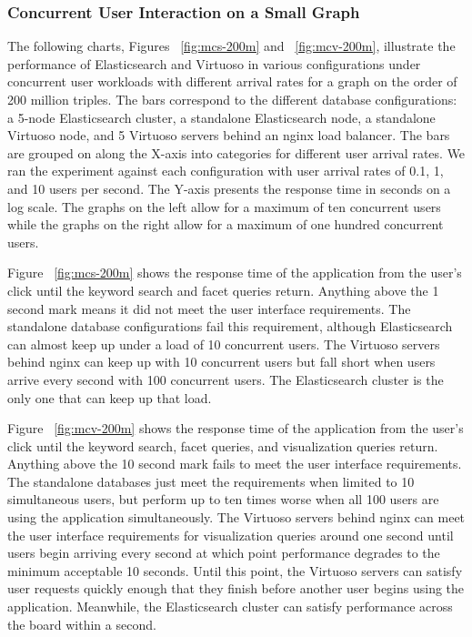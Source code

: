 \subsubsection{Concurrent User Interaction on a Small Graph} 
The following charts, Figures ~\ref{fig:mcs-200m} and ~\ref{fig:mcv-200m}, illustrate the performance of Elasticsearch and Virtuoso in various configurations under concurrent user workloads with different arrival rates for a graph on the order of 200 million triples.
The bars correspond to the different database configurations: a 5-node Elasticsearch cluster, a standalone Elasticsearch node, a standalone Virtuoso node, and 5 Virtuoso servers behind an nginx load balancer.  
The bars are grouped on along the X-axis into categories for different user arrival rates.
We ran the experiment against each configuration with user arrival rates of 0.1, 1, and 10 users per second.
The Y-axis presents the response time in seconds on a log scale.  
The graphs on the left allow for a maximum of ten concurrent users while the graphs on the right allow for a maximum of one hundred concurrent users.  

Figure ~\ref{fig:mcs-200m} shows the response time of the application from the user's click until the keyword search and facet queries return.  Anything above the 1 second mark means it did not meet the user interface requirements.  
The standalone database configurations fail this requirement, although Elasticsearch can almost keep up under a load of 10 concurrent users.
The Virtuoso servers behind nginx can keep up with 10 concurrent users but fall short when users arrive every second with 100 concurrent users.
The Elasticsearch cluster is the only one that can keep up that load.

Figure ~\ref{fig:mcv-200m} shows the response time of the application from the user's click until the keyword search, facet queries, and visualization queries return.  Anything above the 10 second mark fails to meet the user interface requirements.
The standalone databases just meet the requirements when limited to 10 simultaneous users, but perform up to ten times worse when all 100 users are using the application simultaneously.
The Virtuoso servers behind nginx can meet the user interface requirements for visualization queries around one second until users begin arriving every second at which point performance degrades to the minimum acceptable 10 seconds.
Until this point, the Virtuoso servers can satisfy user requests quickly enough that they finish before another user begins using the application. 
Meanwhile, the Elasticsearch cluster can satisfy performance across the board within a second.  

